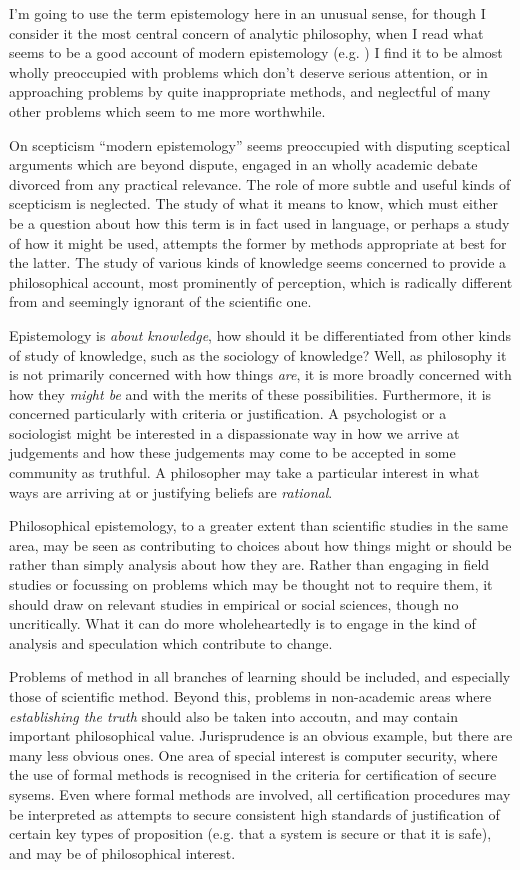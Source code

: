 I'm going to use the term epistemology here in an unusual sense, for though I consider it the most central concern of analytic philosophy, when I read what seems to be a good account of modern epistemology (e.g. \cite{dancy}) I find it to be almost wholly preoccupied with problems which don't deserve serious attention, or in approaching problems by quite inappropriate methods, and neglectful of many other problems which seem to me more worthwhile.

On scepticism ``modern epistemology'' seems preoccupied with disputing sceptical arguments which are beyond dispute, engaged in an wholly academic debate divorced from any practical relevance.
The role of more subtle and useful kinds of scepticism is neglected.
The study of what it means to know, which must either be a question about how this term is in fact used in language, or perhaps a study of how it might be used, attempts the former by methods appropriate at best for the latter.
The study of various kinds of knowledge seems concerned to provide a philosophical account, most prominently of perception, which is radically different from and seemingly ignorant of the scientific one.

Epistemology is {\it about knowledge}, how should it be differentiated from other kinds of study of knowledge, such as the sociology of knowledge?
Well, as philosophy it is not primarily concerned with how things {\it are}, it is more broadly concerned with how they {\it might be} and with the merits of these possibilities.
Furthermore, it is concerned particularly with criteria or justification.
A psychologist or a sociologist might be interested in a dispassionate way in how we arrive at judgements and how these judgements may come to be accepted in some community as truthful.
A philosopher may take a particular interest in what ways are arriving at or justifying beliefs are {\it rational}.

Philosophical epistemology, to a greater extent than scientific studies in the same area, may be seen as contributing to choices about how things might or should be rather than simply analysis about how they are.
Rather than engaging in field studies or focussing on problems which may be thought not to require them, it should draw on relevant studies in empirical or social sciences, though no uncritically.
What it can do more wholeheartedly is to engage in the kind of analysis and speculation which contribute to change.

Problems of method in all branches of learning should be included, and especially those of scientific method.
Beyond this, problems in non-academic areas where {\it establishing the truth} should also be taken into accoutn, and may contain important philosophical value.
Jurisprudence is an obvious example, but there are many less obvious ones.
One area of special interest is computer security, where the use of formal methods is recognised in the criteria for certification of secure sysems.
Even where formal methods are involved, all certification procedures may be interpreted as attempts to secure consistent high standards of justification of certain key types of proposition (e.g. that a system is secure or that it is safe), and may be of philosophical interest.


